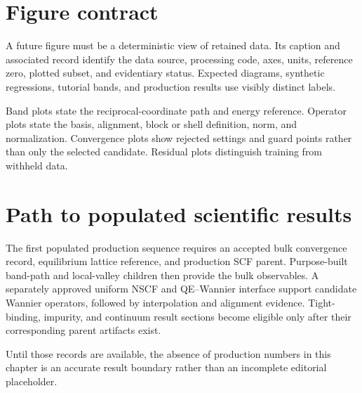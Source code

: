 \section{Figure contract}

A future figure must be a deterministic view of retained data. Its caption and
associated record identify the data source, processing code, axes, units,
reference zero, plotted subset, and evidentiary status. Expected diagrams,
synthetic regressions, tutorial bands, and production results use visibly
distinct labels.

Band plots state the reciprocal-coordinate path and energy reference. Operator
plots state the basis, alignment, block or shell definition, norm, and
normalization. Convergence plots show rejected settings and guard points rather
than only the selected candidate. Residual plots distinguish training from
withheld data.

\section{Path to populated scientific results}

The first populated production sequence requires an accepted bulk convergence
record, equilibrium lattice reference, and production SCF parent. Purpose-built
band-path and local-valley children then provide the bulk observables. A
separately approved uniform NSCF and QE--Wannier interface support candidate
Wannier operators, followed by interpolation and alignment evidence. Tight-
binding, impurity, and continuum result sections become eligible only after
their corresponding parent artifacts exist.

Until those records are available, the absence of production numbers in this
chapter is an accurate result boundary rather than an incomplete editorial
placeholder.
